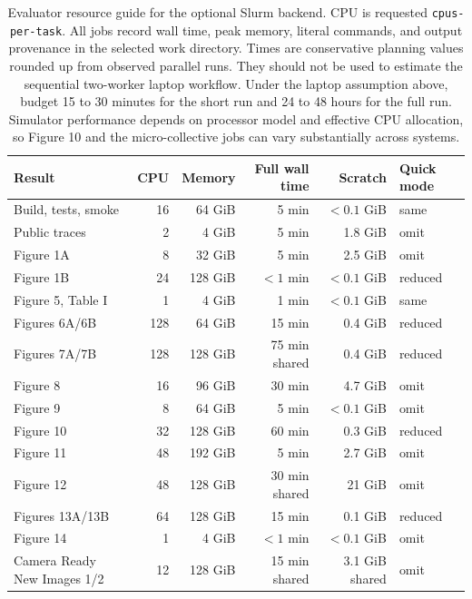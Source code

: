 \documentclass[conference]{IEEEtran}
\begin{document}
\begin{table}[t]
\centering
\footnotesize
\begin{tabular}{@{}lrrrrl@{}}
\toprule
Result & CPU & Memory & Full wall time & Scratch & Quick mode \\
\midrule
Build, tests, smoke & 16 & 64 GiB & 5 min & $<0.1$ GiB & same \\
Public traces & 2 & 4 GiB & 5 min & 1.8 GiB & omit \\
Figure 1A & 8 & 32 GiB & 5 min & 2.5 GiB & omit \\
Figure 1B & 24 & 128 GiB & $<1$ min & $<0.1$ GiB & reduced \\
Figure 5, Table I & 1 & 4 GiB & 1 min & $<0.1$ GiB & same \\
Figures 6A/6B & 128 & 64 GiB & 15 min & 0.4 GiB & reduced \\
Figures 7A/7B & 128 & 128 GiB & 75 min shared & 0.4 GiB & reduced \\
Figure 8 & 16 & 96 GiB & 30 min & 4.7 GiB & omit \\
Figure 9 & 8 & 64 GiB & 5 min & $<0.1$ GiB & omit \\
Figure 10 & 32 & 128 GiB & 60 min & 0.3 GiB & reduced \\
Figure 11 & 48 & 192 GiB & 5 min & 2.7 GiB & omit \\
Figure 12 & 48 & 128 GiB & 30 min shared & 21 GiB & omit \\
Figures 13A/13B & 64 & 128 GiB & 15 min & 0.1 GiB & reduced \\
Figure 14 & 1 & 4 GiB & $<1$ min & $<0.1$ GiB & omit \\
Camera Ready New Images 1/2 & 12 & 128 GiB & 15 min shared & 3.1 GiB shared & omit \\
\bottomrule
\end{tabular}
\caption{Evaluator resource guide for the optional Slurm backend. CPU is
requested \texttt{cpus-per-task}.
All jobs record wall time, peak memory, literal commands, and output
provenance in the selected work directory. Times are conservative planning
values rounded up from observed parallel runs. They should not be used to
estimate the sequential two-worker laptop workflow. Under the laptop
assumption above, budget 15 to 30 minutes for the short run and 24 to 48 hours
for the full run. Simulator performance depends on processor model and
effective CPU allocation, so Figure 10 and the micro-collective jobs can vary
substantially across systems.}
\label{tab:runtime}
\end{table}
\end{document}
